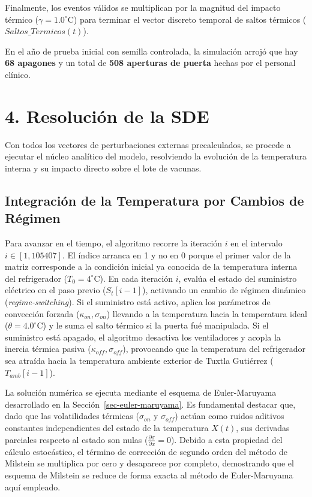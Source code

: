 \documentclass[
  spanish,
  letterpaper,
  DIV=11,
  numbers=noendperiod]{scrreprt}
\theoremstyle{plain}
\theoremstyle{definition}
\theoremstyle{remark}
\begin{document}
Finalmente, los eventos válidos se multiplican por la magnitud del
impacto térmico (\(\gamma = 1.0^\circ\text{C}\)) para terminar el vector
discreto temporal de saltos térmicos (\(Saltos\_Termicos(t)\)).

En el año de prueba inicial con semilla controlada, la simulación arrojó
que hay \textbf{68 apagones} y un total de \textbf{508 aperturas de
puerta} hechas por el personal clínico.

\section{4. Resolución de la SDE}\label{resoluciuxf3n-de-la-sde}

Con todos los vectores de perturbaciones externas precalculados, se
procede a ejecutar el núcleo analítico del modelo, resolviendo la
evolución de la temperatura interna y su impacto directo sobre el lote
de vacunas.

\subsection{Integración de la Temperatura por Cambios de
Régimen}\label{integraciuxf3n-de-la-temperatura-por-cambios-de-ruxe9gimen}

Para avanzar en el tiempo, el algoritmo recorre la iteración \(i\) en el
intervalo \(i \in [1, 105407]\). El índice arranca en 1 y no en 0 porque
el primer valor de la matriz corresponde a la condición inicial ya
conocida de la temperatura interna del refrigerador
(\(T_0 = 4^\circ\text{C}\)). En cada iteración \(i\), evalúa el estado
del suministro eléctrico en el paso previo (\(S_{t}[i-1]\)), activando
un cambio de régimen dinámico (\emph{regime-switching}). Si el
suministro está activo, aplica los parámetros de convección forzada
(\(\kappa_{on}, \sigma_{on}\)) llevando a la temperatura hacia la
temperatura ideal (\(\theta = 4.0^\circ\text{C}\)) y le suma el salto
térmico si la puerta fué manipulada. Si el suministro está apagado, el
algoritmo desactiva los ventiladores y acopla la inercia térmica pasiva
(\(\kappa_{off}, \sigma_{off}\)), provocando que la temperatura del
refrigerador sea atraída hacia la temperatura ambiente exterior de
Tuxtla Gutiérrez (\(T_{amb}[i-1]\)).

La solución numérica se ejecuta mediante el esquema de Euler-Maruyama
desarrollado en la Sección~\ref{sec-euler-maruyama}. Es fundamental
destacar que, dado que las volatilidades térmicas (\(\sigma_{on}\) y
\(\sigma_{off}\)) actúan como ruidos aditivos constantes independientes
del estado de la temperatura \(X(t)\), sus derivadas parciales respecto
al estado son nulas (\(\frac{\partial \sigma}{\partial x} = 0\)). Debido
a esta propiedad del cálculo estocástico, el término de corrección de
segundo orden del método de Milstein se multiplica por cero y desaparece
por completo, demostrando que el esquema de Milstein se reduce de forma
exacta al método de Euler-Maruyama aquí empleado.
\end{document}
